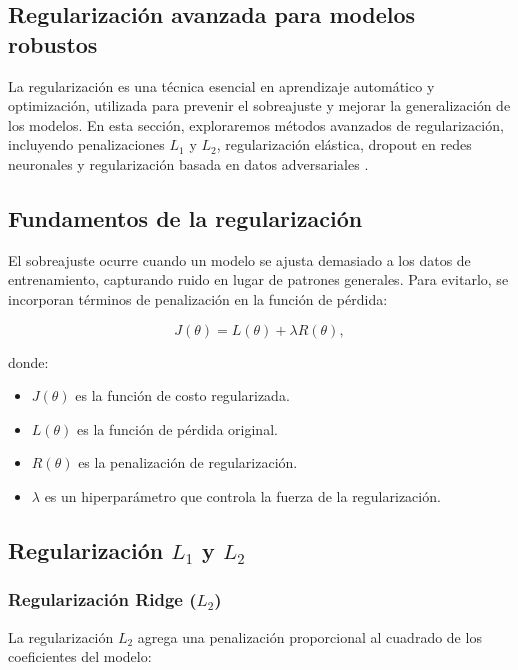 \begin{itemize}
		\section{Regularización avanzada para modelos robustos}
		
		La regularización es una técnica esencial en aprendizaje automático y optimización, utilizada para prevenir el sobreajuste y mejorar la generalización de los modelos. En esta sección, exploraremos métodos avanzados de regularización, incluyendo penalizaciones \( L_1 \) y \( L_2 \), regularización elástica, dropout en redes neuronales y regularización basada en datos adversariales \cite{bishop2006pattern}.
		
		\subsection{Fundamentos de la regularización}
		
		El sobreajuste ocurre cuando un modelo se ajusta demasiado a los datos de entrenamiento, capturando ruido en lugar de patrones generales. Para evitarlo, se incorporan términos de penalización en la función de pérdida:
		
		\begin{equation}
			J(\theta) = L(\theta) + \lambda R(\theta),
		\end{equation}
		
		donde:
		\begin{itemize}
			\item \( J(\theta) \) es la función de costo regularizada.
			\item \( L(\theta) \) es la función de pérdida original.
			\item \( R(\theta) \) es la penalización de regularización.
			\item \( \lambda \) es un hiperparámetro que controla la fuerza de la regularización.
		\end{itemize}
		
		\subsection{Regularización \( L_1 \) y \( L_2 \)}
		
		\subsubsection{Regularización Ridge (\( L_2 \))}
		
		La regularización \( L_2 \) agrega una penalización proporcional al cuadrado de los coeficientes del modelo:
		

\end{itemize}
